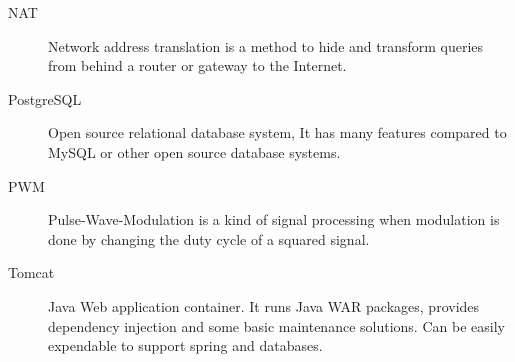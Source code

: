 \begin{description}
	\item[NAT] Network address translation is a method to hide and transform queries from behind a router or gateway to the Internet.
	
	\item[PostgreSQL] Open source relational database system, It has many features compared to MySQL or other open source database systems.
	
	\item[PWM] Pulse-Wave-Modulation is a kind of signal processing when modulation is done by changing the duty cycle of a squared signal.

	\item[Tomcat]  Java Web application container. It runs Java WAR packages, provides dependency injection and some basic maintenance solutions. Can be easily expendable to support spring and databases.
\end{description}

